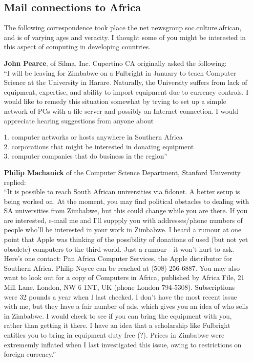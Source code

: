 \subsection{ Mail connections to Africa}
The following correspondence took place the net newsgroup
soc.culture.african, and is of varying ages and veracity.  I thought
some of you might be interested in this aspect of computing in
developing countries.

{\bf John Pearce}, of Silma, Inc. Cupertino CA originally asked the
following:\\
``I will be leaving for Zimbabwe on a Fulbright in January
to teach Computer Science at the University in Harare.
Naturally, the University suffers from lack of equipment,
expertise, and ability to import equipment due to currency
controls. I would like to remedy this situation somewhat by
trying to set up a simple network of PCs with a file server
and possibly an Internet connection. I would appreciate
hearing suggestions from anyone about
 
1. computer networks or hosts anywhere in Southern Africa \\
2. corporations that might be interested in donating equipment\\
3. computer companies that do business in the region''

{\bf Philip Machanick} of the Computer Science Department, Stanford
University replied:\\
``It is possible to reach South African universities via fidonet.
A better setup is being worked on. At the moment, you may find
political obstacles to dealing with SA universities from Zimbabwe,
but this could change while you are there. If you are interested,
e-mail me and I'll suppply you with addresses/phone numbers of people
who'll be interested in your work in Zimbabwe.
I heard a rumour at one point that Apple was thinking of the
possibility of donations of used (but not yet obsolete) computers
to the third world. Just a rumour - it won't hurt to ask.
Here's one contact: Pan Africa Computer Services, the Apple
distributor for Southern Africa. Philip Noyce can be reached at
(508) 256-6887.
You may also want to look out for a copy of Computers in Africa,
published by Africa File, 21 Mill Lane, London, NW 6 1NT, UK (phone
London 794-5308). Subscriptions were 32 pounds a year when I last checked.
I don't have the most recent issue with me, but they have a fair number
of ads, which gives you an idea of who sells in Zimbabwe.
I would check to see if you can bring the equipment with you, rather than
getting it there. I have an idea that a scholarship like Fulbright entitles
you to bring in equipment duty free (?). Prices in Zimbabwe were extrememly 
inflated when I last investigated this issue, owing to restrictions on foreign
currency.''

